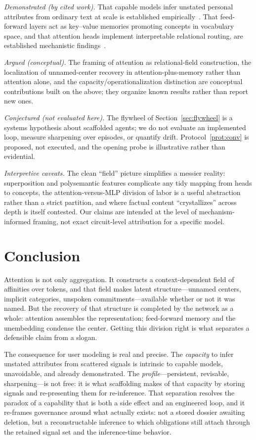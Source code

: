 \documentclass[conference]{IEEEtran}
\theoremstyle{definition}
\begin{document}
\emph{Demonstrated (by cited work).} That capable models infer unstated personal attributes from ordinary text at scale is established empirically~\cite{staab2024beyond}. That feed-forward layers act as key--value memories promoting concepts in vocabulary space, and that attention heads implement interpretable relational routing, are established mechanistic findings~\cite{geva2021kv,geva2022promote,olsson2022induction,elhage2021framework,clark2019bert,hewitt2019}.

\emph{Argued (conceptual).} The framing of attention as relational-field construction, the localization of unnamed-center recovery in attention-plus-memory rather than attention alone, and the capacity/operationalization distinction are conceptual contributions built on the above; they organize known results rather than report new ones.

\emph{Conjectured (not evaluated here).} The flywheel of Section~\ref{sec:flywheel} is a systems hypothesis about scaffolded agents; we do not evaluate an implemented loop, measure sharpening over episodes, or quantify drift. Protocol~\ref{prot:conv} is proposed, not executed, and the opening probe is illustrative rather than evidential.

\emph{Interpretive caveats.} The clean ``field'' picture simplifies a messier reality: superposition and polysemantic features complicate any tidy mapping from heads to concepts, the attention-versus-MLP division of labor is a useful abstraction rather than a strict partition, and where factual content ``crystallizes'' across depth is itself contested. Our claims are intended at the level of mechanism-informed framing, not exact circuit-level attribution for a specific model.

\section{Conclusion}

Attention is not only aggregation. It constructs a context-dependent field of affinities over tokens, and that field makes latent structure---unnamed centers, implicit categories, unspoken commitments---available whether or not it was named. But the recovery of that structure is completed by the network as a whole: attention assembles the representation; feed-forward memory and the unembedding condense the center. Getting this division right is what separates a defensible claim from a slogan.

The consequence for user modeling is real and precise. The \emph{capacity} to infer unstated attributes from scattered signals is intrinsic to capable models, unavoidable, and already demonstrated. The \emph{profile}---persistent, revisable, sharpening---is not free: it is what scaffolding makes of that capacity by storing signals and re-presenting them for re-inference. That separation resolves the paradox of a capability that is both a side effect and an engineered loop, and it re-frames governance around what actually exists: not a stored dossier awaiting deletion, but a reconstructable inference to which obligations still attach through the retained signal set and the inference-time behavior.
\end{document}
